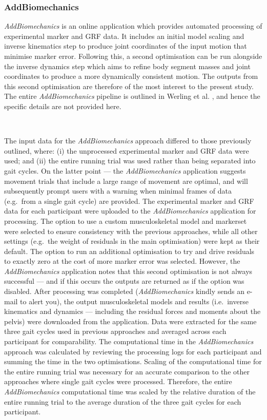 \documentclass[]{elsarticle} %
\begin{document}
\hypertarget{addbiomechanics}{%
\subsubsection{AddBiomechanics}\label{addbiomechanics}}

\emph{AddBiomechanics} \citep{Werling2023} is an online application
which provides automated processing of experimental marker and GRF data.
It includes an initial model scaling and inverse kinematics step to
produce joint coordinates of the input motion that minimise marker
error. Following this, a second optimisation can be run alongside the
inverse dynamics step which aims to refine body segment masses and joint
coordinates to produce a more dynamically consistent motion. The outputs
from this second optimisation are therefore of the most interest to the
present study. The entire \emph{AddBiomechanics} pipeline is outlined in
Werling et al. \citep{Werling2023}, and hence the specific details are
not provided here.

~

The input data for the \emph{AddBiomechanics} approach differed to those
previously outlined, where: (i) the unprocessed experimental marker and
GRF data were used; and (ii) the entire running trial was used rather
than being separated into gait cycles. On the latter point --- the
\emph{AddBiomechanics} application suggests movement trials that include
a large range of movement are optimal, and will subsequently prompt
users with a warning when minimal frames of data (e.g.~from a single
gait cycle) are provided. The experimental marker and GRF data for each
participant were uploaded to the \emph{AddBiomechanics} application for
processing. The option to use a custom musculoskeletal model and
markerset were selected to ensure consistency with the previous
approaches, while all other settings (e.g.~the weight of residuals in
the main optimisation) were kept as their default. The option to run an
additional optimisation to try and drive residuals to exactly zero at
the cost of more marker error was selected. However, the
\emph{AddBiomechanics} application notes that this second optimisation
is not always successful --- and if this occurs the outputs are returned
as if the option was disabled. After processing was completed
(\emph{AddBiomechanics} kindly sends an e-mail to alert you), the output
musculoskeletal models and results (i.e.~inverse kinematics and dynamics
--- including the residual forces and moments about the pelvis) were
downloaded from the application. Data were extracted for the same three
gait cycles used in previous approaches and averaged across each
participant for comparability. The computational time in the
\emph{AddBiomechanics} approach was calculated by reviewing the
processing logs for each participant and summing the time in the two
optimisations. Scaling of the computational time for the entire running
trial was necessary for an accurate comparison to the other approaches
where single gait cycles were processed. Therefore, the entire
\emph{AddBiomechanics} computational time was scaled by the relative
duration of the entire running trial to the average duration of the
three gait cycles for each participant.
\end{document}
